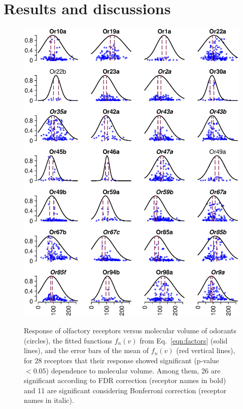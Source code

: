 \documentclass[11pt]{article} %
\newcommand{\numberofreceptors}{ 28 }
\newcommand{\bonferroni}{ 11 }
\newcommand{\fdr}{ 26 }
\begin{document}
\section*{Results and discussions}
\begin{figure}
	\centering
		\includegraphics[width=0.8 \textwidth]{fig/vol-res-}
		\label{fig:vol-res:all}		
	\caption{Response of olfactory receptors  versus molecular volume of odorants (circles),  
			the fitted functions $f_n(v)$ from Eq.~\ref{eqn:factors} (solid lines), 
			and the error bars of the mean of $f_n(v)$ (red vertical lines), 
			for \numberofreceptors receptors that their response showed significant (p-value $<0.05$) dependence to molecular volume. 
			Among them, \fdr are significant according to FDR correction (receptor names in bold) and 
			\bonferroni are significant considering Bonferroni correction (receptor names in italic).
		}
	\label{fig:vol-res}
\end{figure}
\end{document}
